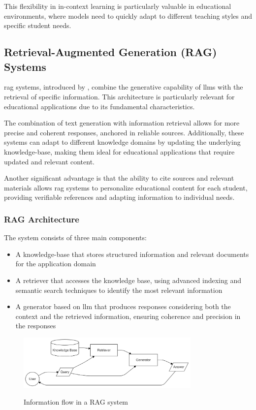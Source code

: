 This flexibility in in-context learning is particularly valuable in educational environments, where models need to quickly adapt to different teaching styles and specific student needs.

\subsection{Retrieval-Augmented Generation (RAG) Systems}

\gls{rag} systems, introduced by \cite{lewis2020retrieval}, combine the generative capability of \gls{llm}s with the retrieval of specific information. This architecture is particularly relevant for educational applications due to its fundamental characteristics.

The combination of text generation with information retrieval allows for more precise and coherent responses, anchored in reliable sources. Additionally, these systems can adapt to different knowledge domains by updating the underlying \gls{knowledge-base}, making them ideal for educational applications that require updated and relevant content.

Another significant advantage is that the ability to cite sources and relevant materials allows \gls{rag} systems to personalize educational content for each student, providing verifiable references and adapting information to individual needs.

\subsubsection{RAG Architecture}

The system consists of three main components:

\begin{itemize}
  \item A \gls{knowledge-base} that stores structured information and relevant documents for the application domain

  \item A \gls{retriever} that accesses the knowledge base, using advanced indexing and semantic search techniques to identify the most relevant information

  \item A \gls{generator} based on \gls{llm} that produces responses considering both the context and the retrieved information, ensuring coherence and precision in the responses
\end{itemize}

\begin{figure}[h]
  \centering
  \includegraphics[width=0.8\textwidth]{figuras/rag-flow.png}
  \label{fig:rag-flow}
  \caption{Information flow in a RAG system}
\end{figure}

